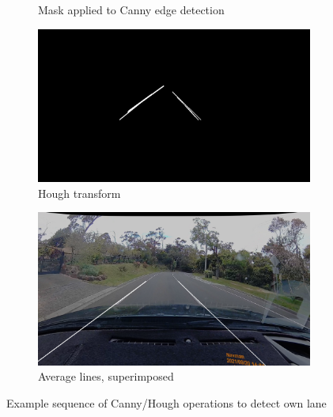\documentclass[11pt,twoside]{report}
\begin{document}
\begin{figure}[h]
\begin{subfigure}{0.4\textwidth}
	\caption{Mask applied to Canny edge detection}
\end{subfigure}
\hfill
\begin{subfigure}{0.4\textwidth}
	\includegraphics[width=\textwidth]{f009_hough.png}
	\caption{Hough transform}
\end{subfigure}
\hfill
\begin{subfigure}{0.4\textwidth}
	\includegraphics[width=\textwidth]{f009_own_lane.png}
	\caption{Average lines, superimposed}
\end{subfigure}
\caption{Example sequence of Canny/Hough operations to detect own lane}
\label{fig:009}
\end{figure}
\end{document}
